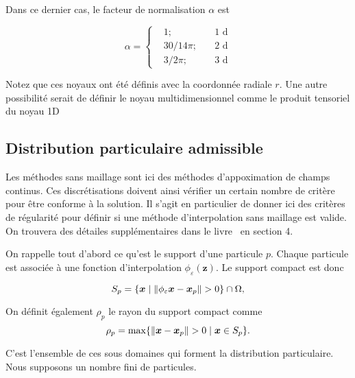 Dans ce dernier cas, le facteur de normalisation $\alpha$ est

\begin{equation*}
    \alpha = \left\{ \begin{aligned}
         & 1;    \quad      & 1\text{ d} \\
         & 30/14 \pi; \quad & 2\text{ d} \\
         & 3/ 2\pi; \quad   & 3\text{ d}
    \end{aligned}
    \right.
\end{equation*}

Notez que ces noyaux ont été définis avec la coordonnée radiale $r$. Une autre possibilité serait de définir le noyau multidimensionnel comme le produit tensoriel du noyau 1D

\subsection{Distribution particulaire admissible}

Les méthodes sans maillage sont ici des méthodes d'appoximation de champs continus. Ces discrétisations doivent ainsi vérifier un certain nombre de critère pour être conforme à la solution. Il s'agit en particulier de donner ici des critères de régularité pour définir si une méthode d'interpolation sans maillage est valide. On trouvera des détailes supplémentaires dans le livre~\cite{s_li_meshfree_2004} en section 4.

On rappelle tout d'abord ce qu'est le support d'une particule $p$. Chaque particule est associée à une fonction d'interpolation $\phi_\varepsilon(\bm{z})$. Le support compact est donc

\begin{equation*}
    S_p = \{\bm{x} \mid \| \phi_\varepsilon \bm{x} - \bm{x}_p \| > 0\} \cap \Omega,
\end{equation*}

On définit également $\rho_p$ le rayon du support compact comme
\begin{equation*}
    \rho_p =  \max \{\| \bm{x} - \bm{x}_p \| > 0 \mid \bm{x} \in S_p\}.
\end{equation*}

C'est l'ensemble de ces sous domaines qui forment la distribution particulaire. Nous supposons un nombre fini de particules. %

